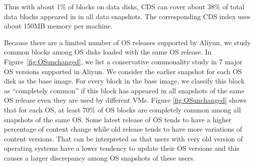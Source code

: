 Thus with about 1\% of blocks on data disks, CDS can cover about 38\% of total data blocks
appeared in in all data snapshots. The corresponding CDS index uses about 150MB memory per machine.






Because there are a limited number of OS releases supported by Aliyun, we study common blocks  among
OS disks loaded with  the same OS release. 
In  Figure~\ref{fig:OSunchanged},  we list a conservative  commonality study in 7 major OS versions  supported
in Aliyun.  We consider the earlier snapshot for each OS disk as the base image.
For every block in the base image, we classify this block as ``completely common''
if  this block has appeared in all snapshots of the same OS release even they are used by different VMs.
Figure \ref{fig:OSunchanged} shows that for each
OS,  at least 70\% of OS blocks are completely common among all snapshots of the same OS. 
Some latest release  of OS tends to have a higher percentage of content change
while  old release tends to have more variations of content versions.
That can be interpreted as that users with very old  version of operating systems
have a lower tendency to update their OS versions and this causes a larger discrepancy
among OS snapshots of these users.

